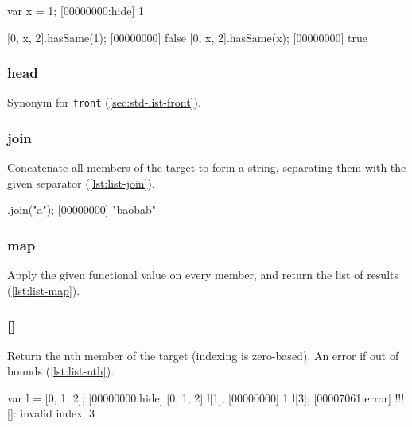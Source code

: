 \begin{urbiscript}[caption=List.hasSame, label=lst:list-hasSame]
var x = 1;
[00000000:hide] 1

[0, x, 2].hasSame(1);
[00000000] false
[0, x, 2].hasSame(x);
[00000000] true
\end{urbiscript}

\subsubsection{head}

Synonym for \lstinline|front| (\autoref{sec:std-list-front}).

\subsubsection{join}

Concatenate all members of the target to form a string, separating
them with the given separator (\autoref{lst:list-join}).

\begin{urbiscript}[caption=List.join, label=lst:list-join]
["b", "ob", "b"].join("a");
[00000000] "baobab"
\end{urbiscript}

\subsubsection{map}

Apply the given functional value on every member, and return the list
of results (\autoref{lst:list-map}).


\subsubsection{[]}
\label{sec:std-list-nth}

Return the nth member of the target (indexing is zero-based). An error
if out of bounds (\autoref{lst:list-nth}).

\begin{urbiscript}[caption={\lstinline|List.'\[\]'|}, label=lst:list-nth]
var l = [0, 1, 2];
[00000000:hide] [0, 1, 2]
l[1];
[00000000] 1
l[3];
[00007061:error] !!! []: invalid index: 3
\end{urbiscript}

